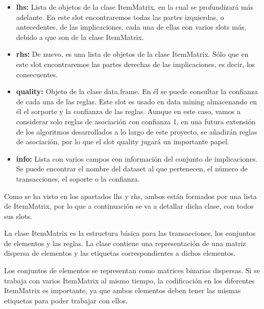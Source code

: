 \begin{itemize}
    \item \textbf{lhs:}
    Lista de objetos de la clase ItemMatrix, en la cual se profundizar\'a m\'as 
    adelante. En este slot encontraremos todas las partes izquierdas, o antecedentes, de las 
    implicaciones, cada una de ellas con varios slots m\'as, debido a que son de la 
    clase ItemMatrix. 

    \item \textbf{rhs:}
    De nuevo, es una lista de objetos de la clase ItemMatrix. S\'olo que en este 
    slot encontraremos las partes derechas de las implicaciones, es decir, los consecuentes.

    \item \textbf{quality:}
    Objeto de la clase data.frame. En \'el se puede consultar la confianza de cada 
    una de las reglas. Este slot es usado en data mining almacenando en \'el el 
    sorporte y la confianza de las reglas. Aunque en este caso, vamos a considerar 
    solo reglas de asociaci\'on con confianza 1, en una futura extensi\'on de los 
    algoritmos desarrollados a lo largo de este proyecto, se a\~nadir\'an reglas de 
    asociaci\'on, por lo que el slot quality jugar\'a un importante papel.

    \item \textbf{info:}
    Lista con varios campos con informaci\'on del conjunto de implicaciones. Se puede 
    encontrar el nombre del dataset al que pertenecen, el n\'umero de transacciones, 
    el soporte o la confianza.

\end{itemize}


Como se ha visto en los apartados lhs y rhs, ambos est\'an formados por una lista de 
ItemMatrix, por lo que a continuaci\'on se va a detallar dicha clase, con todos sus slots.

La clase ItemMatrix es la estructura b\'asica para las transacciones, los 
conjuntos de elementos y las reglas.
La clase contiene una representaci\'on de una matriz dispersa de elementos 
y las etiquetas correspondientes a dichos elementos.

Los conjuntos de elementos se representan como matrices binarias dispersas. 
Si se trabaja con varios ItemMatrix al mismo tiempo, la codificaci\'on 
en los diferentes ItemMatrix es importante, ya que ambos elementos deben tener 
las mismas etiquetas para poder trabajar con ellos.

